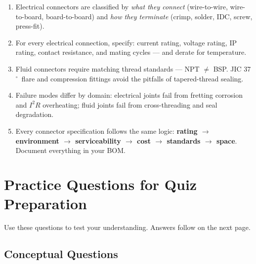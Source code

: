 \documentclass[11pt,letterpaper,twoside,openany]{book}
\begin{document}
\begin{keyconceptbox}
\begin{enumerate}[nosep,leftmargin=1.5em]
  \item Electrical connectors are classified by \emph{what they connect} (wire-to-wire, wire-to-board, board-to-board) and \emph{how they terminate} (crimp, solder, IDC, screw, press-fit).
  \item For every electrical connection, specify: current rating, voltage rating, IP rating, contact resistance, and mating cycles --- and derate for temperature.
  \item Fluid connectors require matching thread standards --- NPT $\neq$ BSP. JIC 37$^{\circ}$\ flare and compression fittings avoid the pitfalls of tapered-thread sealing.
  \item Failure modes differ by domain: electrical joints fail from fretting corrosion and $I^2R$ overheating; fluid joints fail from cross-threading and seal degradation.
  \item Every connector specification follows the same logic: \textbf{rating $\to$ environment $\to$ serviceability $\to$ cost $\to$ standards $\to$ space}. Document everything in your BOM.
\end{enumerate}
\end{keyconceptbox}


\FloatBarrier
\section{Practice Questions for Quiz Preparation}

Use these questions to test your understanding. Answers follow on the next page.

\subsection{Conceptual Questions}
\end{document}
